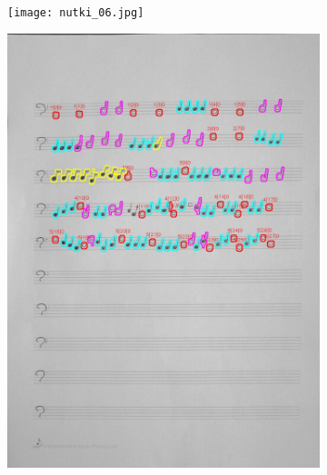 \documentclass[11pt]{article}
\begin{document}
\begin{figure}[H]
    \centering
    \begin{subfigure}{.5\textwidth}
        \centering
        \graphicspath{ {Resources/} }
        \texttt{[image: nutki\_06.jpg]}
        \label{fig:sub1}
    \end{subfigure}%
    \begin{subfigure}{.5\textwidth}
        \centering
        \graphicspath{ {blobs/} }
        \includegraphics[width=\linewidth]{6_cnts.jpg}
        \label{fig:sub2}
    \end{subfigure}
    \label{fig:test}
\end{figure}
\end{document}

